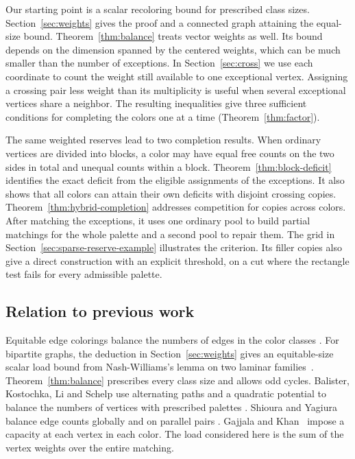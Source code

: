 \documentclass[11pt]{article}
\begin{document}
Our starting point is a scalar recoloring bound for prescribed class sizes. Section~\ref{sec:weights} gives the proof and a connected graph attaining the equal-size bound. Theorem~\ref{thm:balance} treats vector weights as well. Its bound depends on the dimension spanned by the centered weights, which can be much smaller than the number of exceptions. In Section~\ref{sec:cross} we use each coordinate to count the weight still available to one exceptional vertex. Assigning a crossing pair less weight than its multiplicity is useful when several exceptional vertices share a neighbor. The resulting inequalities give three sufficient conditions for completing the colors one at a time (Theorem~\ref{thm:factor}).

The same weighted reserves lead to two completion results. When ordinary vertices are divided into blocks, a color may have equal free counts on the two sides in total and unequal counts within a block. Theorem~\ref{thm:block-deficit} identifies the exact deficit from the eligible assignments of the exceptions. It also shows that all colors can attain their own deficits with disjoint crossing copies. Theorem~\ref{thm:hybrid-completion} addresses competition for copies across colors. After matching the exceptions, it uses one ordinary pool to build partial matchings for the whole palette and a second pool to repair them. The grid in Section~\ref{sec:sparse-reserve-example} illustrates the criterion. Its filler copies also give a direct construction with an explicit threshold, on a cut where the rectangle test fails for every admissible palette.

\subsection*{Relation to previous work}

Equitable edge colorings balance the numbers of edges in the color classes \cite{McDiarmid,CariolaroFu}. For bipartite graphs, the deduction in Section~\ref{sec:weights} gives an equitable-size scalar load bound from Nash-Williams's lemma on two laminar families~\cite{NashWilliams}. Theorem~\ref{thm:balance} prescribes every class size and allows odd cycles. Balister, Kostochka, Li and Schelp use alternating paths and a quadratic potential to balance the numbers of vertices with prescribed palettes \cite{BKLS}. Shioura and Yagiura balance edge counts globally and on parallel pairs \cite{SY}. Gajjala and Khan~\cite{GK} impose a capacity at each vertex in each color. The load considered here is the sum of the vertex weights over the entire matching.
\end{document}
